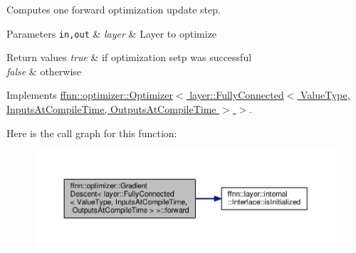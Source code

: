 Computes one forward optimization update step. 


\begin{DoxyParams}[1]{Parameters}
\mbox{\tt in,out}  & {\em layer} & Layer to optimize \\
\hline
\end{DoxyParams}

\begin{DoxyRetVals}{Return values}
{\em true} & if optimization setp was successful \\
\hline
{\em false} & otherwise \\
\hline
\end{DoxyRetVals}


Implements \hyperlink{classffnn_1_1optimizer_1_1_optimizer_a80505cfdeba0a3c8d1db19a2821613f2}{ffnn\-::optimizer\-::\-Optimizer$<$ layer\-::\-Fully\-Connected$<$ Value\-Type, Inputs\-At\-Compile\-Time, Outputs\-At\-Compile\-Time $>$ $>$}.



Here is the call graph for this function\-:
\nopagebreak
\begin{figure}[H]
\begin{center}
\leavevmode
\includegraphics[width=350pt]{classffnn_1_1optimizer_1_1_gradient_descent_3_01layer_1_1_fully_connected_3_01_value_type_00_01_5f7b01db2ae4d39760d70ee323649a60_afa8fe46160d16887fc7abb4de34a65e5_cgraph}
\end{center}
\end{figure}


